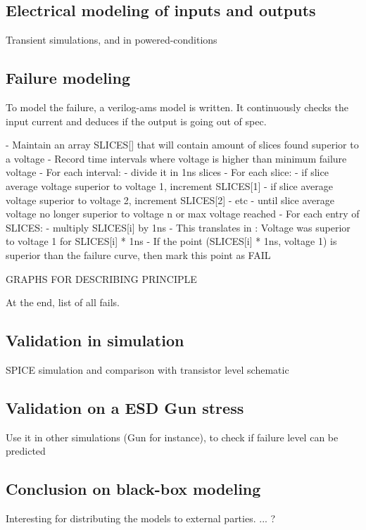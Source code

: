 \subsection{Electrical modeling of inputs and outputs}


Transient simulations, and in powered-conditions

%

\subsection{Failure modeling}


%
To model the failure, a verilog-ams model is written.
It continuously checks the input current and deduces if the output is going out of spec.

\begin{algorithmic}
- Maintain an array SLICES[] that will contain amount of slices found superior to a voltage
- Record time intervals where voltage is higher than minimum failure voltage
- For each interval:
  - divide it in 1ns slices
  - For each slice:
      - if slice average voltage superior to voltage 1, increment SLICES[1]
      - if slice average voltage superior to voltage 2, increment SLICES[2]
      - etc
      - until slice average voltage no longer superior to voltage n or max voltage reached
- For each entry of SLICES:
  - multiply SLICES[i] by 1ns
  - This translates in : Voltage was superior to voltage 1 for SLICES[i] * 1ns
  - If the point (SLICES[i] * 1ns, voltage 1) is superior than the failure curve, then mark this point as FAIL
\end{algorithmic}

GRAPHS FOR DESCRIBING PRINCIPLE

At the end, list of all fails.

\subsection{Validation in simulation}

SPICE simulation and comparison with transistor level schematic

\subsection{Validation on a ESD Gun stress}
Use it in other simulations (Gun for instance), to check if failure level can be predicted

\subsection{Conclusion on black-box modeling}

Interesting for distributing the models to external parties.
... ?
